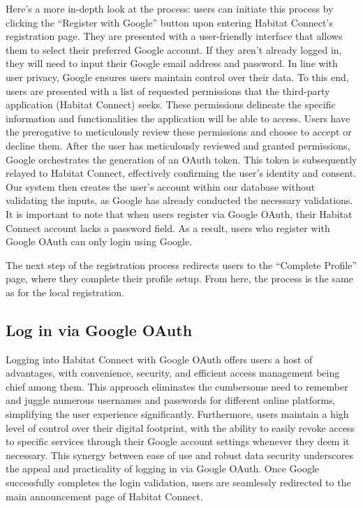\documentclass[conference]{IEEEtran}
\begin{document}
Here's a more in-depth look at the process: users can initiate this process by clicking the “Register with Google” button upon entering Habitat Connect’s registration page. They are presented with a user-friendly interface that allows them to select their preferred Google account. If they aren't already logged in, they will need to input their Google email address and password. In line with user privacy, Google ensures users maintain control over their data. To this end, users are presented with a list of requested permissions that the third-party application (Habitat Connect) seeks. These permissions delineate the specific information and functionalities the application will be able to access. Users have the prerogative to meticulously review these permissions and choose to accept or decline them. After the user has meticulously reviewed and granted permissions, Google orchestrates the generation of an OAuth token. This token is subsequently relayed to Habitat Connect, effectively confirming the user's identity and consent. Our system then creates the user’s account within our database without validating the inputs, as Google has already conducted the necessary validations. It is important to note that when users register via Google OAuth, their Habitat Connect account lacks a password field. As a result, users who register with Google OAuth can only login using Google.

The next step of the registration process redirects users to the “Complete Profile” page, where they complete their profile setup. From here, the process is the same as for the local registration.
\subsection{Log in via Google OAuth}
Logging into Habitat Connect with Google OAuth offers users a host of advantages, with convenience, security, and efficient access management being chief among them. This approach eliminates the cumbersome need to remember and juggle numerous usernames and passwords for different online platforms, simplifying the user experience significantly. Furthermore, users maintain a high level of control over their digital footprint, with the ability to easily revoke access to specific services through their Google account settings whenever they deem it necessary. This synergy between ease of use and robust data security underscores the appeal and practicality of logging in via Google OAuth. Once Google successfully completes the login validation, users are seamlessly redirected to the main announcement page of Habitat Connect.
\end{document}

